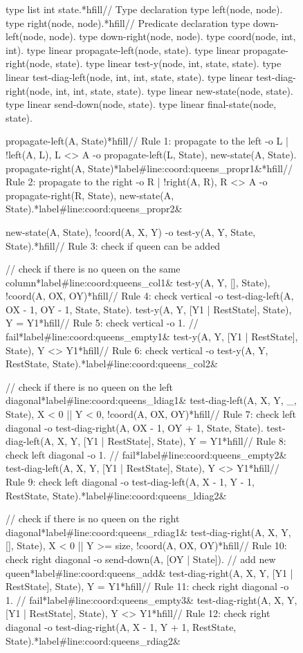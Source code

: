 \begin{figure}[h!]
\begin{LineCode}[fontsize=\scriptsize,commandchars=\*\#\&]
type list int state.*hfill// Type declaration
type left(node, node).  type right(node, node).*hfill// Predicate declaration
type down-left(node, node).  type down-right(node, node).
type coord(node, int, int).
type linear propagate-left(node, state).
type linear propagate-right(node, state).
type linear test-y(node, int, state, state).
type linear test-diag-left(node, int, int, state, state).
type linear test-diag-right(node, int, int, state, state).
type linear new-state(node, state).
type linear send-down(node, state).
type linear final-state(node, state).

propagate-left(A, State)*hfill// Rule 1: propagate to the left
  -o {L | !left(A, L), L <> A -o propagate-left(L, State)}, new-state(A, State).
propagate-right(A, State)*label#line:coord:queens_propr1&*hfill// Rule 2: propagate to the right
  -o {R | !right(A, R), R <> A -o propagate-right(R, State)}, new-state(A, State).*label#line:coord:queens_propr2&

new-state(A, State), !coord(A, X, Y) -o test-y(A, Y, State, State).*hfill// Rule 3: check if queen can be added

// check if there is no queen on the same column*label#line:coord:queens_col1&
test-y(A, Y, [], State), !coord(A, OX, OY)*hfill// Rule 4: check vertical
  -o test-diag-left(A, OX - 1, OY - 1, State, State).
test-y(A, Y, [Y1 | RestState], State), Y = Y1*hfill// Rule 5: check vertical
  -o 1. // fail*label#line:coord:queens_empty1&
test-y(A, Y, [Y1 | RestState], State), Y <> Y1*hfill// Rule 6: check vertical
  -o test-y(A, Y, RestState, State).*label#line:coord:queens_col2&

// check if there is no queen on the left diagonal*label#line:coord:queens_ldiag1&
test-diag-left(A, X, Y, _, State), X < 0 || Y < 0, !coord(A, OX, OY)*hfill// Rule 7: check left diagonal
  -o test-diag-right(A, OX - 1, OY + 1, State, State).
test-diag-left(A, X, Y, [Y1 | RestState], State), Y = Y1*hfill// Rule 8: check left diagonal
  -o 1. // fail*label#line:coord:queens_empty2&
test-diag-left(A, X, Y, [Y1 | RestState], State), Y <> Y1*hfill// Rule 9: check left diagonal
  -o test-diag-left(A, X - 1, Y - 1, RestState, State).*label#line:coord:queens_ldiag2&

// check if there is no queen on the right diagonal*label#line:coord:queens_rdiag1&
test-diag-right(A, X, Y, [], State), X < 0 || Y >= size, !coord(A, OX, OY)*hfill// Rule 10: check right diagonal
  -o send-down(A, [OY | State]). // add new queen*label#line:coord:queens_add&
test-diag-right(A, X, Y, [Y1 | RestState], State), Y = Y1*hfill// Rule 11: check right diagonal
  -o 1. // fail*label#line:coord:queens_empty3&
test-diag-right(A, X, Y, [Y1 | RestState], State), Y <> Y1*hfill// Rule 12: check right diagonal
  -o test-diag-right(A, X - 1, Y + 1, RestState, State).*label#line:coord:queens_rdiag2&


\end{LineCode}
\end{figure}
